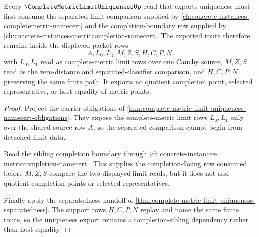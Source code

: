 \begin{theorem}
\label{thm:complete-metric-limit-uniqueness-completion-sibling-route}
Every $\CompleteMetricLimitUniquenessUp$ read that exports uniqueness must first consume the separated limit comparison supplied by \autoref{ch:concrete-instances-completemetric-namecert} and the completion-boundary row supplied by \autoref{ch:concrete-instances-metriccompletion-namecert}. The exported route therefore remains inside the displayed packet rows
$$
A,L_{0},L_{1},M,Z,S,H,C,P,N
$$
with $L_{0},L_{1}$ read as complete-metric limit rows over one Cauchy source, $M,Z,S$ read as the zero-distance and separated-classifier comparison, and $H,C,P,N$ preserving the same finite path. It exports no quotient completion point, selected representative, or host equality of metric points.
\end{theorem}
\begin{proof}
Project the carrier obligations of \autoref{thm:complete-metric-limit-uniqueness-namecert-obligations}. They expose the complete-metric limit rows $L_{0},L_{1}$ only over the shared source row $A$, so the separated comparison cannot begin from detached limit data.

Read the sibling completion boundary through \autoref{ch:concrete-instances-metriccompletion-namecert}. This supplies the completion-facing row consumed before $M,Z,S$ compare the two displayed limit reads, but it does not add quotient completion points or selected representatives.

Finally apply the separatedness handoff of \autoref{thm:complete-metric-limit-uniqueness-separatedness}. The support rows $H,C,P,N$ replay and name the same finite route, so the uniqueness export remains a completion-sibling dependency rather than host equality.
\end{proof}
